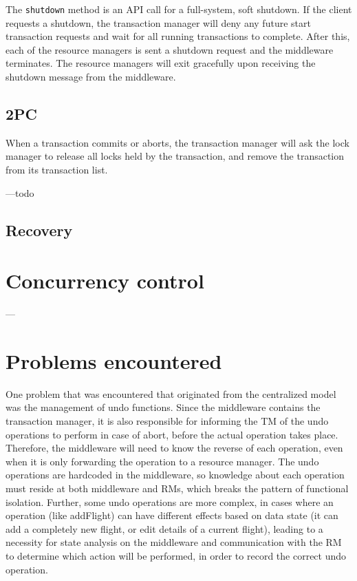 \documentclass[11pt]{article}
\begin{document}
The \texttt{shutdown} method is an API call for a full-system, soft shutdown. If the client requests a shutdown, the transaction manager will deny any future start transaction requests and wait for all running transactions to complete. After this, each of the resource managers is sent a shutdown request and the middleware terminates. The resource managers will exit gracefully upon receiving the shutdown message from the middleware. \par

\subsection*{2PC}

When a transaction commits or aborts, the transaction manager will ask the lock manager to release all locks held by the transaction, and remove the transaction from its transaction list. \par

---todo

\subsection*{Recovery}

\section*{Concurrency control}

---

\section*{Problems encountered}

One problem that was encountered that originated from the centralized model was the management of undo functions. Since the middleware contains the transaction manager, it is also responsible for informing the TM of the undo operations to perform in case of abort, before the actual operation takes place. Therefore, the middleware will need to know the reverse of each operation, even when it is only forwarding the operation to a resource manager. The undo operations are hardcoded in the middleware, so knowledge about each operation must reside at both middleware and RMs, which breaks the pattern of functional isolation. Further, some undo operations are more complex, in cases where an operation (like addFlight) can have different effects based on data state (it can add a completely new flight, or edit details of a current flight), leading to a necessity for state analysis on the middleware and communication with the RM to determine which action will be performed, in order to record the correct undo operation. \par
\end{document}
